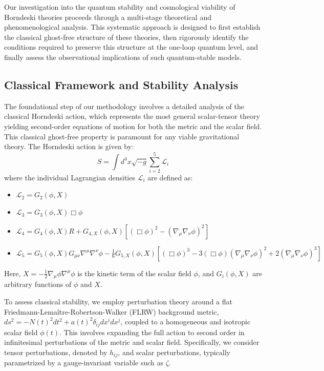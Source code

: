 \documentclass[twocolumn]{aastex631}
\begin{document}
Our investigation into the quantum stability and cosmological viability of Horndeski theories proceeds through a multi-stage theoretical and phenomenological analysis. This systematic approach is designed to first establish the classical ghost-free structure of these theories, then rigorously identify the conditions required to preserve this structure at the one-loop quantum level, and finally assess the observational implications of such quantum-stable models.

\subsection{Classical Framework and Stability Analysis}
The foundational step of our methodology involves a detailed analysis of the classical Horndeski action, which represents the most general scalar-tensor theory yielding second-order equations of motion for both the metric and the scalar field. This classical ghost-free property is paramount for any viable gravitational theory. The Horndeski action is given by:
\begin{equation}
S = \int d^4x \sqrt{-g} \sum_{i=2}^{5} \mathcal{L}_i
\end{equation}
where the individual Lagrangian densities $\mathcal{L}_i$ are defined as:
\begin{itemize}
    \item $\mathcal{L}_2 = G_2(\phi, X)$
    \item $\mathcal{L}_3 = G_3(\phi, X) \Box\phi$
    \item $\mathcal{L}_4 = G_4(\phi, X) R + G_{4,X}(\phi, X) [(\Box\phi)^2 - (\nabla_\mu\nabla_\nu\phi)^2]$
    \item $\mathcal{L}_5 = G_5(\phi, X) G_{\mu\nu}\nabla^\mu\nabla^\nu\phi - \frac{1}{6}G_{5,X}(\phi, X) [(\Box\phi)^3 - 3(\Box\phi)(\nabla_\mu\nabla_\nu\phi)^2 + 2(\nabla_\mu\nabla_\nu\phi)^3]$
\end{itemize}
Here, $X = -\frac{1}{2}\nabla_\mu\phi \nabla^\mu\phi$ is the kinetic term of the scalar field $\phi$, and $G_i(\phi, X)$ are arbitrary functions of $\phi$ and $X$.

To assess classical stability, we employ perturbation theory around a flat Friedmann-Lemaître-Robertson-Walker (FLRW) background metric, $ds^2 = -N(t)^2 dt^2 + a(t)^2 \delta_{ij} dx^i dx^j$, coupled to a homogeneous and isotropic scalar field $\phi(t)$. This involves expanding the full action to second order in infinitesimal perturbations of the metric and scalar field. Specifically, we consider tensor perturbations, denoted by $h_{ij}$, and scalar perturbations, typically parametrized by a gauge-invariant variable such as $\zeta$.
\end{document}
